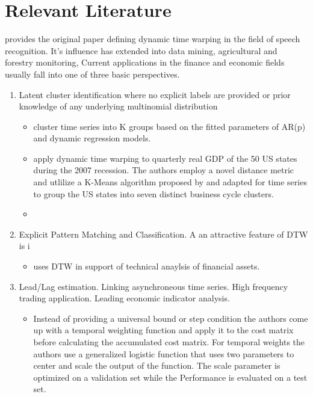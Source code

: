 \documentclass[12pt]{article}
\begin{document}
\section{Relevant Literature}

\cite{SakoeChiba_IEEE_1978} provides the original paper defining dynamic time warping in the field of speech recognition. It's influence has extended into data mining, agricultural and forestry monitoring,  
Current applications in the finance and economic fields usually fall into one of three basic perspectives.
\begin{enumerate}
    \item Latent cluster identification where no explicit labels are provided or prior knowledge of any underlying multinomial distribution
    \begin{itemize}
        \item \parencite{FruhwirthKaufmann2004} cluster time series into K groups based on the fitted parameters of AR(p) and dynamic regression models.
        \item \parencite{FrancesWiemann2020} apply dynamic time warping to quarterly real GDP of the 50 US states during the 2007 recession. The authors employ a novel distance metric and utlilize a K-Means algorithm proposed by \cite{PETITJEAN2011678} and adapted for time series to group the US states into seven distinct business cycle clusters.
        \item 
    \end{itemize}
    \item Explicit Pattern Matching and Classification. A an attractive feature of DTW is i
    \begin{itemize}
        \item \cite{WAN2017151} uses DTW in support of technical anaylsis of financial assets.
    \end{itemize}
    \item Lead/Lag estimation. Linking asynchroneous time series. High frequency trading application. Leading economic indicator analysis.
    \begin{itemize}
        \item \parencite{JEONG20112231} Instead of providing a universal bound or step condition the authors come up with a temporal weighting function and apply it to the cost matrix before calculating the accumulated cost matrix. For temporal weights the authors use a generalized logistic function that uses two parameters to center and scale the output of the function. The scale parameter is optimized on a validation set while the Performance is evaluated on a test set. 

\end{itemize}
\end{enumerate}
\end{document}
